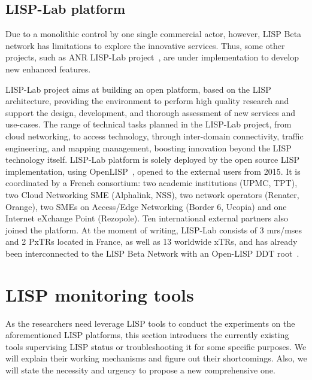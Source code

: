 \subsection{LISP-Lab platform}
\label{subsec:platform_lab}
Due to a monolithic control by one single commercial actor, however, LISP Beta network has limitations to explore the innovative services. Thus, some other projects, such as ANR LISP-Lab project~\cite{lisplab}, are under implementation to develop new enhanced features.

LISP-Lab project aims at building an open platform, based on the LISP architecture, providing the environment to perform high quality research and support the design, development, and thorough assessment of new services and use-cases. The range of technical tasks
planned in the LISP-Lab project, from cloud networking, to access
technology, through inter-domain connectivity, traffic engineering,
and mapping management, boosting innovation beyond the LISP technology
itself. LISP-Lab platform is solely deployed by the open source LISP implementation, using OpenLISP~\cite{OpenLISP}, opened to the external users from 2015. It is coordinated by a French consortium: two academic institutions (UPMC, TPT), two Cloud Networking SME (Alphalink, NSS), two network operators (Renater, Orange), two SMEs on Access/Edge Networking (Border 6, Ucopia) and one Internet eXchange Point (Rezopole). Ten international external partners also joined the platform. At the moment of writing, LISP-Lab consists of 3 \acrshort{mr}s/\acrshort{ms}es and 2 PxTRs located in France, as well as 13 worldwide xTRs, and has already been interconnected to the LISP Beta Network with an Open-LISP DDT root~\cite{fuller2012lisp}.


\section{LISP monitoring tools}
\label{sec:monitor}
As the researchers need leverage LISP tools to conduct the experiments on the aforementioned LISP platforms, this section introduces the currently existing tools supervising LISP status or troubleshooting it for some specific purposes. We will explain their working mechanisms and figure out their shortcomings. Also, we will state the necessity and urgency to propose a new comprehensive one.

